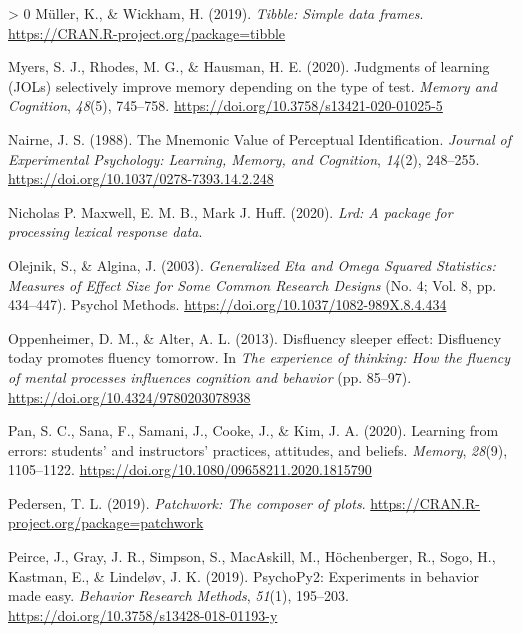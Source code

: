 \documentclass[
  english,
  jou]{apa7}
\newlength{\cslhangindent}
\newenvironment{CSLReferences}[3] %
 {%
  \setlength{\parindent}{0pt}
  \ifodd #1 \everypar{\setlength{\hangindent}{\cslhangindent}}\ignorespaces\fi
  \ifnum #2 > 0
  \setlength{\parskip}{#2\baselineskip}
  \fi
 }%
 {}
\begin{document}
\begin{CSLReferences}{1}{0}
\leavevmode\hypertarget{ref-R-tibble}{}%
Müller, K., \& Wickham, H. (2019). \emph{Tibble: Simple data frames}. \url{https://CRAN.R-project.org/package=tibble}

\leavevmode\hypertarget{ref-Myers2020}{}%
Myers, S. J., Rhodes, M. G., \& Hausman, H. E. (2020). {Judgments of learning (JOLs) selectively improve memory depending on the type of test}. \emph{Memory and Cognition}, \emph{48}(5), 745--758. \url{https://doi.org/10.3758/s13421-020-01025-5}

\leavevmode\hypertarget{ref-Nairne1988}{}%
Nairne, J. S. (1988). {The Mnemonic Value of Perceptual Identification}. \emph{Journal of Experimental Psychology: Learning, Memory, and Cognition}, \emph{14}(2), 248--255. \url{https://doi.org/10.1037/0278-7393.14.2.248}

\leavevmode\hypertarget{ref-Maxwell2020}{}%
Nicholas P. Maxwell, E. M. B., Mark J. Huff. (2020). \emph{Lrd: A package for processing lexical response data}.

\leavevmode\hypertarget{ref-Olejnik2003}{}%
Olejnik, S., \& Algina, J. (2003). \emph{{Generalized Eta and Omega Squared Statistics: Measures of Effect Size for Some Common Research Designs}} (No. 4; Vol. 8, pp. 434--447). Psychol Methods. \url{https://doi.org/10.1037/1082-989X.8.4.434}

\leavevmode\hypertarget{ref-Oppenheimer2013}{}%
Oppenheimer, D. M., \& Alter, A. L. (2013). {Disfluency sleeper effect: Disfluency today promotes fluency tomorrow}. In \emph{The experience of thinking: How the fluency of mental processes influences cognition and behavior} (pp. 85--97). \url{https://doi.org/10.4324/9780203078938}

\leavevmode\hypertarget{ref-Pan2020}{}%
Pan, S. C., Sana, F., Samani, J., Cooke, J., \& Kim, J. A. (2020). {Learning from errors: students' and instructors' practices, attitudes, and beliefs}. \emph{Memory}, \emph{28}(9), 1105--1122. \url{https://doi.org/10.1080/09658211.2020.1815790}

\leavevmode\hypertarget{ref-R-patchwork}{}%
Pedersen, T. L. (2019). \emph{Patchwork: The composer of plots}. \url{https://CRAN.R-project.org/package=patchwork}

\leavevmode\hypertarget{ref-Peirce2019}{}%
Peirce, J., Gray, J. R., Simpson, S., MacAskill, M., Höchenberger, R., Sogo, H., Kastman, E., \& Lindeløv, J. K. (2019). {PsychoPy2: Experiments in behavior made easy}. \emph{Behavior Research Methods}, \emph{51}(1), 195--203. \url{https://doi.org/10.3758/s13428-018-01193-y}


\end{CSLReferences}
\end{document}
